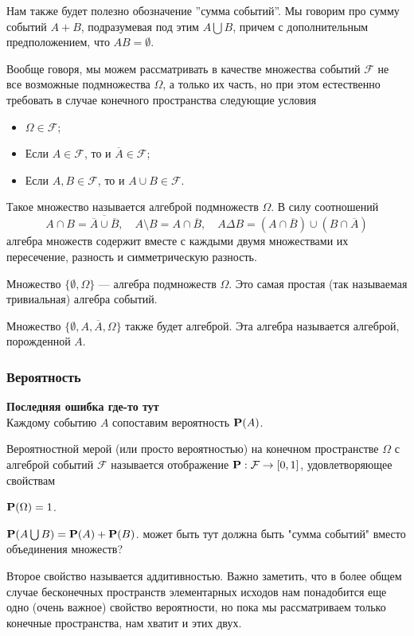 \documentclass[11 pt,russian]{article}
\begin{document}
Нам также будет полезно обозначение ''сумма событий''. Мы говорим про сумму событий $A+B$, подразумевая под этим $A\bigcup B$, причем с дополнительным предположением, что $AB= \emptyset$. 

Вообще говоря, мы можем рассматривать в качестве множества событий $\mathcal{F}$ не все возможные подмножества $\Omega$, а только их часть, но при этом естественно требовать в случае конечного пространства следующие условия 
\begin{itemize}
\item $\Omega\in\mathcal{F}$; 
\item Если $A\in \mathcal{F}$, то и $\overline{A}\in \mathcal{F}$;
\item Если $A,B\in \mathcal{F}$, то и $A\cup B\in \mathcal{F}$.
\end{itemize}
Такое множество называется алгеброй подмножеств $\Omega$. В силу соотношений
$$
A\cap B = \overline{\overline{A}\cup \overline{B}},\quad
A\setminus B = A\cap \overline{B},\quad
A\Delta B = (A\cap \overline{B})\cup (B\cap \overline{A})
$$
алгебра множеств содержит вместе с каждыми двумя множествами их пересечение, разность и симметрическую разность.
\begin{Exam}
Множество $\{\emptyset, \Omega\}$ --- алгебра подмножеств $\Omega$. Это самая простая (так называемая тривиальная) алгебра событий.

Множество $\{\emptyset, A, \overline{A},\Omega\}$ также будет алгеброй. Эта алгебра называется алгеброй, порожденной $A$. 
\end{Exam}
\subsubsection{Вероятность}
{\bf Последняя ошибка где-то тут\\ }
Каждому событию $A$ сопоставим вероятность ${\bf P}(A)$. 
\begin{Def}
Вероятностной мерой (или просто вероятностью) на конечном пространстве $\Omega$ с алгеброй событий $\mathcal{F}$ называется отображение ${\bf P}:\mathcal{F}\to [0,1]$, удовлетворяющее свойствам
\begin{enumerate*}
\item ${\bf P}(\Omega) = 1$.
\item ${\bf P}(A \bigcup B) = {\bf P}(A) + {\bf P}(B)$. может быть тут должна быть "сумма событий" вместо объединения множеств?
\end{enumerate*}
\end{Def}
Второе свойство называется аддитивностью. Важно заметить, что в более общем случае бесконечных пространств элементарных исходов нам понадобится еще одно (очень важное) свойство вероятности, но пока мы рассматриваем только конечные пространства, нам хватит и этих двух.
\end{document}
